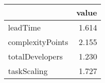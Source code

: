 \begin{tabular}{lr}
\toprule
{} &  value \\
\midrule
leadTime         &  1.614 \\
complexityPoints &  2.155 \\
totalDevelopers  &  1.230 \\
taskScaling      &  1.727 \\
\bottomrule
\end{tabular}
